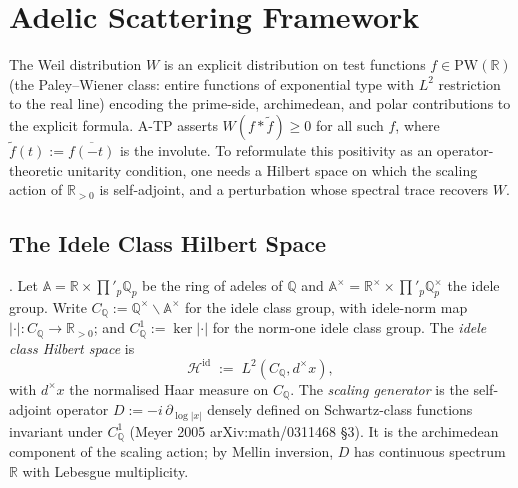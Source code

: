 \section{Adelic Scattering Framework}
\label{v4-arith:w7-j:framework}

The Weil distribution \(W\) is an explicit distribution on test functions
\(f\in\mathrm{PW}(\mathbb{R})\) (the Paley--Wiener class: entire functions
of exponential type with \(L^{2}\) restriction to the real line) encoding
the prime-side, archimedean, and polar contributions to the explicit
formula. A-TP asserts \(W(f*\widetilde{f})\geq 0\) for all such \(f\),
where \(\widetilde{f}(t):=\overline{f(-t)}\) is the involute. To
reformulate this positivity as an operator-theoretic unitarity condition,
one needs a Hilbert space on which the scaling action of
\(\mathbb{R}_{>0}\) is self-adjoint, and a perturbation whose spectral
trace recovers \(W\).

\subsection{The Idele Class Hilbert Space}
\label{v4-arith:w7-j:framework:hilbert}

\begin{definition}
\label{v4-arith:w7-j:def:H-idele}
\ClaimStatusDefinitional. Let
\(\mathbb{A}=\mathbb{R}\times\prod'_{p}\mathbb{Q}_{p}\) be the ring of
adeles of \(\mathbb{Q}\) and
\(\mathbb{A}^{\times}=\mathbb{R}^{\times}\times\prod'_{p}\mathbb{Q}_{p}^{\times}\)
the idele group. Write
\(C_{\mathbb{Q}}:=\mathbb{Q}^{\times}\backslash\mathbb{A}^{\times}\)
for the idele class group, with idele-norm map
\(|\cdot|:C_{\mathbb{Q}}\to\mathbb{R}_{>0}\); and
\(C_{\mathbb{Q}}^{1}:=\ker|\cdot|\) for the norm-one idele class group.
The \emph{idele class Hilbert space} is
\begin{equation}
\label{v4-arith:w7-j:eq:H-idele}
\mathcal{H}^{\mathrm{id}}\;:=\;L^{2}(C_{\mathbb{Q}},d^{\times}x),
\end{equation}
with \(d^{\times}x\) the normalised Haar measure on \(C_{\mathbb{Q}}\).
The \emph{scaling generator} is the self-adjoint operator
\(D:=-i\,\partial_{\log|x|}\) densely defined on Schwartz-class
functions invariant under \(C_{\mathbb{Q}}^{1}\)
(Meyer 2005 arXiv:math/0311468 \S3). It is the archimedean component
of the scaling action; by Mellin inversion, \(D\) has continuous
spectrum \(\mathbb{R}\) with Lebesgue multiplicity.
\end{definition}

